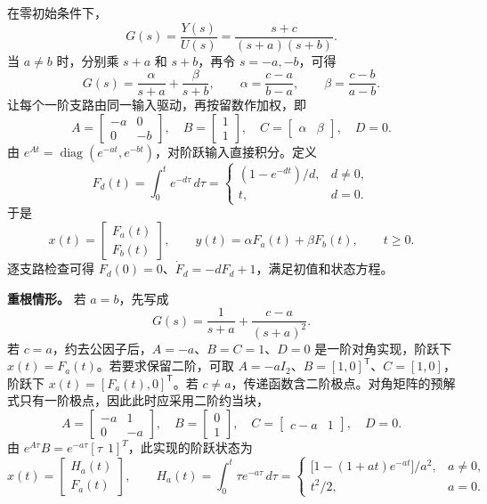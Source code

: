 \sol 在零初始条件下，
\[
    G(s)=\frac{Y(s)}{U(s)}=\frac{s+c}{(s+a)(s+b)}.
\]
当 $a\ne b$ 时，分别乘 $s+a$ 和 $s+b$，再令 $s=-a,-b$，可得
\[
    G(s)=\frac{\alpha}{s+a}+\frac{\beta}{s+b},\qquad
    \alpha=\frac{c-a}{b-a},\qquad \beta=\frac{c-b}{a-b}.
\]
让每个一阶支路由同一输入驱动，再按留数作加权，即
\[
    \boxed{
    A=\begin{bmatrix}-a&0\\0&-b\end{bmatrix},\quad
    B=\begin{bmatrix}1\\1\end{bmatrix},\quad
    C=\begin{bmatrix}\alpha&\beta\end{bmatrix},\quad D=0.}
\]
由 $e^{At}=\operatorname{diag}(e^{-at},e^{-bt})$，对阶跃输入直接积分。定义
\[
    F_d(t)=\int_0^t e^{-d\tau}\,d\tau
    =\begin{cases}
        (1-e^{-dt})/d,& d\ne 0,\\
        t,& d=0.
    \end{cases}
\]
于是
\[
    \boxed{x(t)=\begin{bmatrix}F_a(t)\\F_b(t)\end{bmatrix}},\qquad
    y(t)=\alpha F_a(t)+\beta F_b(t),\qquad t\geq0.
\]
逐支路检查可得 $F_d(0)=0$、$\dot F_d=-dF_d+1$，满足初值和状态方程。

\textbf{重根情形。} 若 $a=b$，先写成
\[
    G(s)=\frac{1}{s+a}+\frac{c-a}{(s+a)^2}.
\]
若 $c=a$，约去公因子后，$A=-a$、$B=C=1$、$D=0$ 是一阶对角实现，阶跃下 $x(t)=F_a(t)$。若要求保留二阶，可取 $A=-aI_2$、$B=[1,0]^{\mathsf T}$、$C=[1,0]$，阶跃下 $x(t)=[F_a(t),0]^{\mathsf T}$。若 $c\ne a$，传递函数含二阶极点。对角矩阵的预解式只有一阶极点，因此此时应采用二阶约当块，
\[
    A=\begin{bmatrix}-a&1\\0&-a\end{bmatrix},\quad
    B=\begin{bmatrix}0\\1\end{bmatrix},\quad
    C=\begin{bmatrix}c-a&1\end{bmatrix},\quad D=0.
\]
由 $e^{A\tau}B=e^{-a\tau}[\tau\ \ 1]^T$，此实现的阶跃状态为
\[
    x(t)=\begin{bmatrix}H_a(t)\\F_a(t)\end{bmatrix},\qquad
    H_a(t)=\int_0^t \tau e^{-a\tau}\,d\tau
    =\begin{cases}
        \bigl[1-(1+at)e^{-at}\bigr]/a^2,&a\ne0,\\
        t^2/2,&a=0.
    \end{cases}
\]

